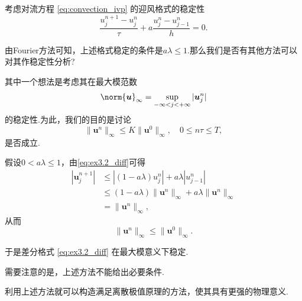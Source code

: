 \begin{instance}
    考虑对流方程 \eqref{eq:convection_ivp} 的迎风格式的稳定性
    \begin{equation}\label{eq:ex3.2_diff}
        \frac{u_j^{n+1} - u_j^n}{\tau} + a \frac{u_j^n - u_{j-1}^n}{h} = 0.
    \end{equation}
    
    由Fourier方法可知，上述格式稳定的条件是$a\lambda \leq 1$.那么我们是否有其他方法可以对其作稳定性分析?\par
    其中一个想法是考虑其在最大模范数
    \begin{equation*}
        \norm{\bm{u}}_\infty=\sup_{-\infty< j<+\infty}|\bm{u}_j^n|
    \end{equation*}
    的稳定性.为此，我们的目的是讨论
    \begin{equation*}
        \|\bm{u}^n\|_\infty \leq K \|\bm{u}^0\|_\infty, \quad 0 \leq n\tau \leq T,
    \end{equation*}
    是否成立.\par
    假设$0<a\lambda\leq 1$，由\eqref{eq:ex3.2_diff}可得
    \begin{align*}
        |\bm{u}_j^{n+1}|&\leq |(1-a\lambda)u_j^n|+a\lambda|u_{j-1}^n|\\
        &\leq (1-a\lambda)\|\bm{u}^n\|_\infty + a\lambda \|\bm{u}^n\|_\infty\\
        &=\|\bm{u}^n\|_\infty,
    \end{align*}
    从而
    \begin{equation*}
        \|\bm{u}^n\|_\infty \leq \|\bm{u}^0\|_\infty.
    \end{equation*}

    于是差分格式 \eqref{eq:ex3.2_diff} 在最大模意义下稳定.\par
    \begin{attention}
        需要注意的是，上述方法不能给出必要条件.\par
        利用上述方法就可以构造满足离散极值原理的方法，使其具有更强的物理意义.
    \end{attention}
\end{instance}

